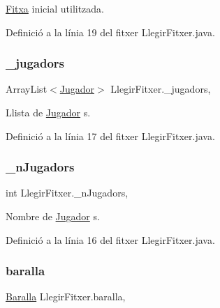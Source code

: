 \mbox{\hyperlink{class_fitxa}{Fitxa}} inicial utilitzada. 



Definició a la línia 19 del fitxer Llegir\+Fitxer.\+java.

\mbox{\label{class_llegir_fitxer_a8009ba77511b60a636adb738cddef7b4}} 
\subsubsection{\texorpdfstring{\+\_\+jugadors}{\_jugadors}}
{\footnotesize\ttfamily Array\+List$<$\mbox{\hyperlink{class_jugador}{Jugador}}$>$ Llegir\+Fitxer.\+\_\+jugadors\hspace{0.3cm}{\ttfamily [static]}, {\ttfamily [private]}}



Llista de \mbox{\hyperlink{class_jugador}{Jugador}} s. 



Definició a la línia 17 del fitxer Llegir\+Fitxer.\+java.

\mbox{\label{class_llegir_fitxer_a1095570f847e8cd810965ef23cb9d8c7}} 
\subsubsection{\texorpdfstring{\+\_\+n\+Jugadors}{\_nJugadors}}
{\footnotesize\ttfamily int Llegir\+Fitxer.\+\_\+n\+Jugadors\hspace{0.3cm}{\ttfamily [static]}, {\ttfamily [private]}}



Nombre de \mbox{\hyperlink{class_jugador}{Jugador}} s. 



Definició a la línia 16 del fitxer Llegir\+Fitxer.\+java.

\mbox{\label{class_llegir_fitxer_a4b0573e74fe3c97662eb06322cdd4bae}} 
\subsubsection{\texorpdfstring{baralla}{baralla}}
{\footnotesize\ttfamily \mbox{\hyperlink{class_baralla}{Baralla}} Llegir\+Fitxer.\+baralla\hspace{0.3cm}{\ttfamily [static]}, {\ttfamily [private]}}




